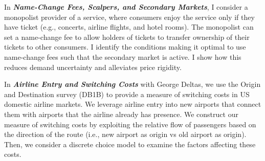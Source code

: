 \documentclass[12pt]{article}
\begin{document}
\vspace{0.15cm}

In \emph{\textbf{Name-Change Fees, Scalpers, and Secondary Markets}}, I consider a monopolist provider of a service, where consumers enjoy the service only if they have ticket (e.g., concerts, airline flights, and hotel rooms).
The monopolist can set a name-change fee to allow holders of tickets to transfer ownership of their tickets to other consumers.
I identify the conditions making it optimal to use name-change fees  such that the secondary market is active. I show how this reduces demand uncertainty and alleviates price rigidity.

\vspace{0.15cm}

In \emph{\textbf{Airline Entry and Switching Costs}} with George Deltas,
we use the Origin and Destination survey (DB1B) to provide a measure of switching costs in US domestic airline markets.
We leverage airline entry into new airports that connect them with airports that the airline already has presence.
We construct our measure of switching costs by exploiting the relative flow of passengers based on the direction of the route (i.e., new airport as origin vs old airport as origin).
Then, we consider a discrete choice model to examine the factors affecting these costs.
\end{document}
